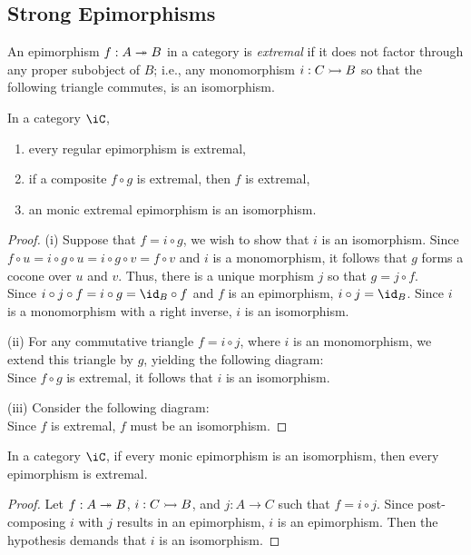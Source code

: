 \documentclass{amsart}
\begin{document}
\subsection{Strong Epimorphisms}
\label{sec:strong-epimorphisms}

\begin{defn}
  An epimorphism $f : A \twoheadrightarrow B$ in a category is \emph{extremal} if it does not factor through any proper subobject of $B$; i.e., any monomorphism $i : C \rightarrowtail B$ so that the following triangle commutes, is an isomorphism.
  \[\]
\end{defn}

\begin{prop}
  In a category $\iC$,
  \begin{enumerate}
  \item every regular epimorphism is extremal,
  \item if a composite $f \circ g$ is extremal, then $f$ is extremal,
  \item an monic extremal epimorphism is an isomorphism.
  \end{enumerate}
\end{prop}
\begin{proof}
  (i) Suppose that $f = i \circ g$, we wish to show that $i$ is an isomorphism.
  Since $f \circ u = i \circ g \circ u = i \circ g \circ v = f \circ v$ and $i$ is a monomorphism, it follows that $g$ forms a cocone over $u$ and $v$.
  Thus, there is a unique morphism $j$ so that $g = j \circ f$.
  \[\]
  Since $i \circ j \circ f = i \circ g = \id_{B} \circ f$ and $f$ is an epimorphism, $i \circ j = \id_{B}$.
  Since $i$ is a monomorphism with a right inverse, $i$ is an isomorphism.

  (ii) For any commutative triangle $f = i \circ j$, where $i$ is an monomorphism, we extend this triangle by $g$, yielding the following diagram:
  \[\]
  Since $f \circ g$ is extremal, it follows that $i$ is an isomorphism.

  (iii) Consider the following diagram:
  \[\]
  Since $f$ is extremal, $f$ must be an isomorphism.
\end{proof}

\begin{prop}
  In a category $\iC$, if every monic epimorphism is an isomorphism, then every epimorphism is extremal.
\end{prop}
\begin{proof}
  Let $f : A \twoheadrightarrow B$, $i : C \rightarrowtail B$, and $j : A \to C$ such that $f = i \circ j$.
  Since post-composing $i$ with $j$ results in an epimorphism, $i$ is an epimorphism.
  Then the hypothesis demands that $i$ is an isomorphism.
\end{proof}
\end{document}
